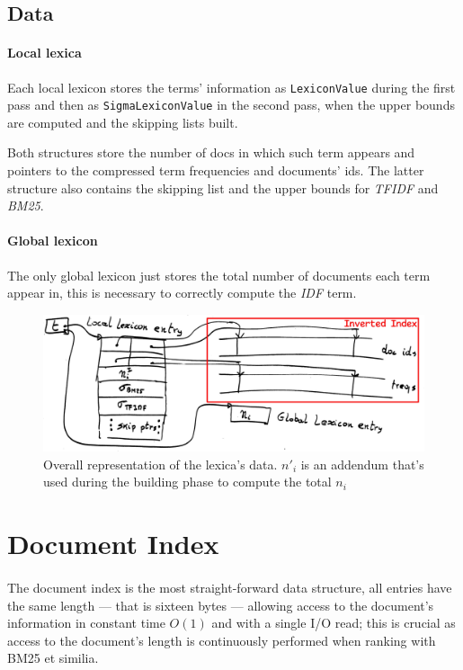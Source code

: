 \subsection{Data}
\label{subsection:lexicon-data}

\paragraph{Local lexica}
Each local lexicon stores the terms' information as \texttt{LexiconValue} during the first pass and then as \texttt{SigmaLexiconValue} in the second pass, when the upper bounds are computed and the skipping lists built.

Both structures store the number of docs in which such term appears and pointers to the compressed term frequencies and documents' ids. The latter structure also contains the skipping list and the upper bounds for \textit{TFIDF} and \textit{BM25}.

\paragraph{Global lexicon}
The only global lexicon just stores the total number of documents each term appear in, this is necessary to correctly compute the \textit{IDF} term.

\begin{figure}[H]
	\centering
	\includegraphics[width=0.9\linewidth]{assets/lexica}
	\caption{Overall representation of the lexica's data. ${n'}_i$ is an addendum that's used during the building phase to compute the total $n_i$}
	\label{fig:lexica}
\end{figure}

\section{Document Index}

\paragraph{}
The document index is the most straight-forward data structure, all entries have the same length --- that is sixteen bytes --- allowing access to the document's information in constant time $O(1)$ and with a single I/O read; this is crucial as access to the document's length is continuously performed when ranking with BM25 et similia.

